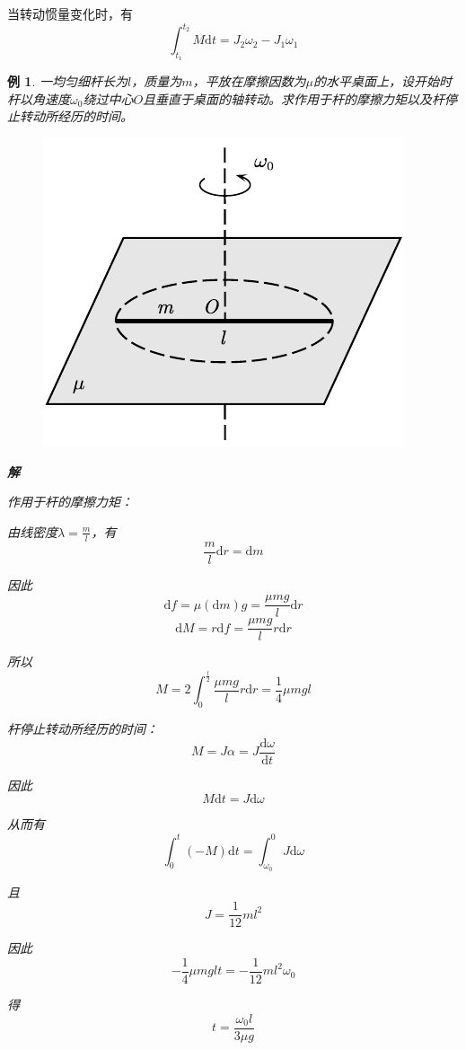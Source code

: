 \documentclass[12pt, a4paper, twoside]{ctexbook}
\newtheorem{example}[theorem]{例}
\begin{document}
当转动惯量变化时，有
$$
\int_{t_1}^{t_2}M\mathrm{d}t=J_2\omega_2-J_1\omega_1
$$
\begin{example}
    一均匀细杆长为$l$，质量为$m$，平放在摩擦因数为$\mu$的水平桌面上，设开始时杆以角速度$\omega_0$绕过中心$O$且垂直于桌面的轴转动。求作用于杆的摩擦力矩以及杆停止转动所经历的时间。
    \begin{figure}[H]
        \centerline{\includegraphics[scale=1.0]{CH03EX03.pdf}}
    \end{figure}
    \noindent\textbf{解}

    {\sonti 作用于杆的摩擦力矩}：

    由线密度$\lambda=\frac{m}{l}$，有
    $$
    \frac{m}{l}\mathrm{d}r=\mathrm{d}m
    $$
    
    因此
    $$
    \mathrm{d}f=\mu\left(\mathrm{d}m\right)g=\frac{\mu mg}{l}\mathrm{d}r
    $$
    $$
    \mathrm{d}M=r\mathrm{d}f=\frac{\mu mg}{l}r\mathrm{d}r
    $$
    
    所以
    $$
    M=2\int_{0}^{\frac{l}{2}}\frac{\mu mg}{l}r\mathrm{d}r=\frac{1}{4}\mu mgl
    $$

    {\sonti 杆停止转动所经历的时间}：
    $$
    M=J\alpha=J\frac{\mathrm{d}\omega}{\mathrm{d}t}
    $$

    因此
    $$
    M\mathrm{d}t=J\mathrm{d}\omega
    $$

    从而有
    $$
    \int_{0}^{t}\left(-M\right)\mathrm{d}t=\int_{\omega_0}^{0}J\mathrm{d}\omega
    $$

    且
    $$
    J=\frac{1}{12}ml^2
    $$

    因此
    $$
    -\frac{1}{4}\mu mglt=-\frac{1}{12}ml^2\omega_0
    $$

    得
    $$
    t=\frac{\omega_0l}{3\mu g}
    $$


\end{example}
\end{document}
